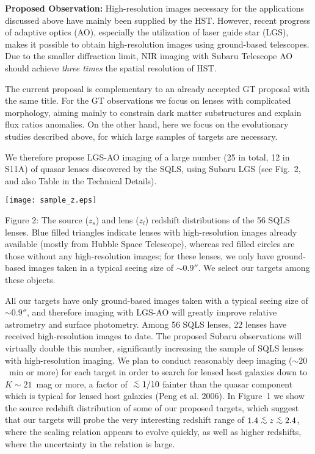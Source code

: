 \documentclass[a4paper,11pt]{article}
\newcommand{\lesssim}{\lower.5ex\hbox{$\; \buildrel < \over \sim \;$}}
\begin{document}
{\bf Proposed Observation:} 
High-resolution images necessary for the applications discussed above
have mainly been supplied by the HST. However, recent progress of
adaptive optics (AO), especially the utilization of laser guide star
(LGS), makes it possible to obtain high-resolution images using
ground-based telescopes. Due to the smaller diffraction limit, NIR imaging with Subaru Telescope AO should achieve {\it three times} the spatial resolution of HST.

The current proposal is complementary to an already accepted GT proposal with the same title. For the GT observations we focus on lenses with complicated morphology, aiming mainly to constrain dark matter substructures and explain flux ratios anomalies. On the other hand, here we focus on the evolutionary studies described above, for which large samples of targets are necessary.

We therefore propose LGS-AO imaging of a large number (25 in total, 12 in S11A)
 of quasar lenses discovered by the SQLS,
using Subaru LGS (see Fig.~2, and also Table in the
Technical Details).

\medskip

\begin{minipage}{0.4\textwidth}
\texttt{[image: sample\_z.eps]}
\end{minipage}
\begin{minipage}{0.55\textwidth}
  Figure 2: The source ($z_s$) and lens ($z_l$) redshift distributions
  of the 56 SQLS lenses. Blue filled triangles indicate lenses with
  high-resolution images already available (mostly from Hubble Space
  Telescope), whereas red filled circles are those without any
  high-resolution images; for these lenses, we only have ground-based
  images taken in a typical seeing size of $\sim 0.9''$. We select our targets among these objects.%
\end{minipage}

\medskip


All our targets have only ground-based images
taken with a typical seeing size of $\sim 0.9''$, and therefore imaging with LGS-AO will greatly improve relative astrometry
and surface photometry. Among 56 SQLS
lenses, 22 lenses have received high-resolution images to date. The
proposed Subaru observations will virtually double this number, significantly
increasing the sample of SQLS lenses with high-resolution imaging. 
We plan to conduct reasonably deep imaging ($\sim 20$~min or more) for each
target in order to search for lensed host galaxies down to $K \sim
21$~mag or more, a factor of $\lesssim1/10$ fainter than the quasar component
which is typical for lensed host galaxies (Peng et al. 2006). In
Figure~1 we show the source redshift distribution of some of our proposed targets,
which suggest that our targets will probe the very interesting redshift
range of $1.4 \lesssim z \lesssim 2.4$, where the scaling relation
appears to evolve quickly, as well as higher redshifts, where the uncertainty in the relation is large.  
\end{document}
